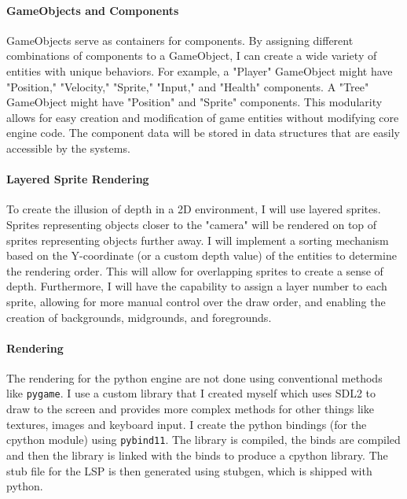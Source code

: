 \documentclass{article}
\begin{document}
\paragraph{GameObjects and Components}
GameObjects serve as containers for components. By assigning different combinations of components to a GameObject, I can create a wide variety of entities with unique behaviors. For example, a "Player" GameObject might have "Position," "Velocity," "Sprite," "Input," and "Health" components. A "Tree" GameObject might have "Position" and "Sprite" components. This modularity allows for easy creation and modification of game entities without modifying core engine code. The component data will be stored in data structures that are easily accessible by the systems.

\paragraph{Layered Sprite Rendering}
To create the illusion of depth in a 2D environment, I will use layered sprites. Sprites representing objects closer to the "camera" will be rendered on top of sprites representing objects further away. I will implement a sorting mechanism based on the Y-coordinate (or a custom depth value) of the entities to determine the rendering order. This will allow for overlapping sprites to create a sense of depth. Furthermore, I will have the capability to assign a layer number to each sprite, allowing for more manual control over the draw order, and enabling the creation of backgrounds, midgrounds, and foregrounds.

\paragraph{Rendering}
The rendering for the python engine are not done using conventional methods like \verb|pygame|. I use a custom library that I created myself which uses SDL2 to draw to the screen and provides more complex methods for other things like textures, images and keyboard input. I create the python bindings (for the cpython module) using \verb|pybind11|. The library is compiled, the binds are compiled and then the library is linked with the binds to produce a cpython library. The stub file for the LSP is then generated using stubgen, which is shipped with python.
\end{document}
